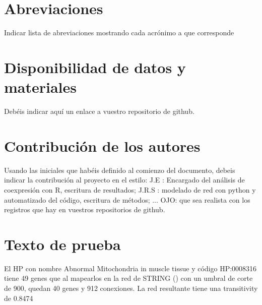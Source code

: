\documentclass{bmcart}
\begin{document}
	\begin{backmatter}
	
		\section*{Abreviaciones}%
			Indicar lista de abreviaciones mostrando cada acrónimo a que corresponde
		
		\section*{Disponibilidad de datos y materiales}%
			Debéis indicar aquí un enlace a vuestro repositorio de github.
		
		\section*{Contribución de los autores}
			Usando las iniciales que habéis definido al comienzo del documento, debeis indicar la contribución al proyecto en el estilo:
			J.E : Encargado del análisis de coexpresión con R, escritura de resultados; J.R.S : modelado de red con python y automatizado del código, escritura de métodos; ...
			OJO: que sea realista con los registros que hay en vuestros repositorios de github. 
		
		
		
	
	\end{backmatter}
	
	\section *{Texto de prueba}
	El HP con nombre Abnormal Mitochondria in muscle tissue y código HP:0008316 tiene 49 genes que al mapearlos en la red de STRING (\cite{Szklarczyk2025}) con un umbral de corte de 900, quedan 40 genes y 912 conexiones.
	La red resultante tiene una transitivity de 0.8474
	
\end{document}
